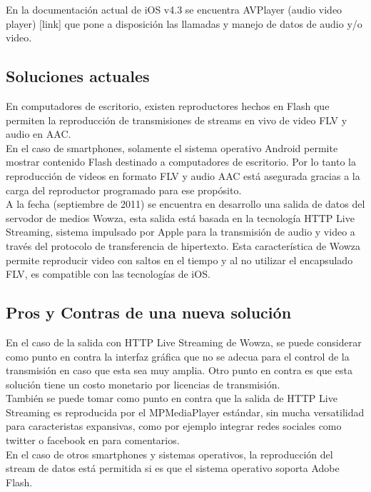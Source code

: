 En la documentación actual de iOS v4.3 se encuentra AVPlayer (audio video player) [link] que pone a disposición las llamadas y manejo de datos de audio y/o video.


\subsection{Soluciones actuales}
En computadores de escritorio, existen reproductores hechos en Flash que permiten la reproducción de transmisiones de streams en vivo de video FLV y audio en AAC.\\

	En el caso de smartphones, solamente el sistema operativo Android permite mostrar contenido Flash destinado a computadores de escritorio. Por lo tanto la reproducción de videos en formato FLV y audio AAC está asegurada gracias a la carga del reproductor programado para ese propósito.\\

A la fecha (septiembre de 2011) se encuentra en desarrollo una salida de datos del servodor de medios Wowza, esta salida está basada en la tecnología HTTP Live Streaming, sistema impulsado por Apple para la transmisión de audio y video a través del protocolo de transferencia de hipertexto. Esta característica de Wowza permite reproducir video con  saltos en el tiempo y al no utilizar el encapsulado FLV, es compatible con las tecnologías de iOS.

\subsection{Pros y Contras de una nueva solución}
En el caso de la salida con HTTP Live Streaming de Wowza, se puede considerar como punto en contra la interfaz gráfica que no se adecua para el control de la transmisión en caso que esta sea muy amplia. Otro punto en contra es que esta solución tiene un costo monetario por licencias de transmisión.\\

	También se puede tomar como punto en contra que la salida de HTTP Live Streaming es reproducida por el MPMediaPlayer estándar, sin mucha versatilidad para caracteristas expansivas, como por ejemplo integrar redes sociales como twitter o facebook en para comentarios.\\

	En el caso de otros smartphones y sistemas operativos, la reproducción del stream de datos está permitida si es que el sistema operativo soporta Adobe Flash.\\

